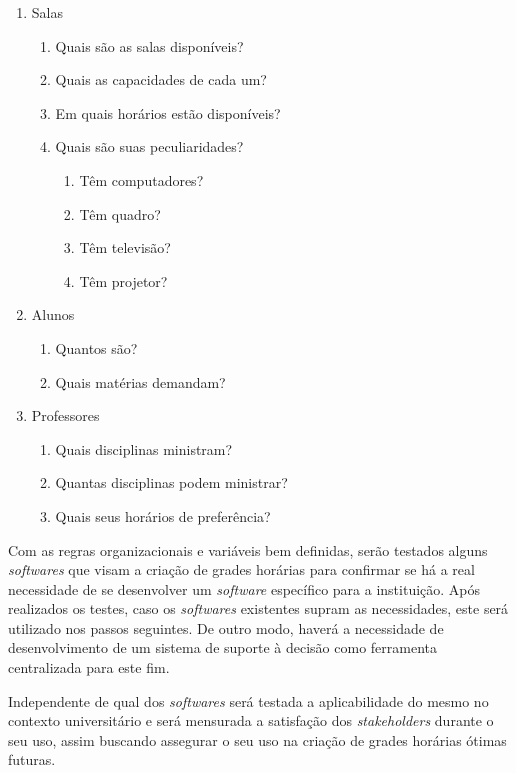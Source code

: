 \begin{enumerate}
  \item Salas
        \begin{enumerate}
          \item Quais são as salas disponíveis?
          \item Quais as capacidades de cada um?
          \item Em quais horários estão disponíveis?
          \item Quais são suas peculiaridades?
                \begin{enumerate}
                  \item Têm computadores?
                  \item Têm quadro?
                  \item Têm televisão?
                  \item Têm projetor?
                \end{enumerate}
        \end{enumerate}
  \item Alunos
        \begin{enumerate}
          \item Quantos são?
          \item Quais matérias demandam?
        \end{enumerate}
  \item Professores
        \begin{enumerate}
          \item Quais disciplinas ministram?
          \item Quantas disciplinas podem ministrar?
          \item Quais seus horários de preferência?
        \end{enumerate}
\end{enumerate}

Com as regras organizacionais e variáveis bem definidas, serão testados alguns \textit{softwares} que visam a criação de grades horárias para confirmar se há a real necessidade de se desenvolver um \textit{software} específico para a instituição. Após realizados os testes, caso os \textit{softwares} existentes supram as necessidades, este será utilizado nos passos seguintes. De outro modo, haverá a necessidade de desenvolvimento de um sistema de suporte à decisão como ferramenta centralizada para este fim.

Independente de qual dos \textit{softwares} será testada a aplicabilidade do mesmo no contexto universitário e será mensurada a satisfação dos \textit{stakeholders} durante o seu uso, assim buscando assegurar o seu uso na criação de grades horárias ótimas futuras.

